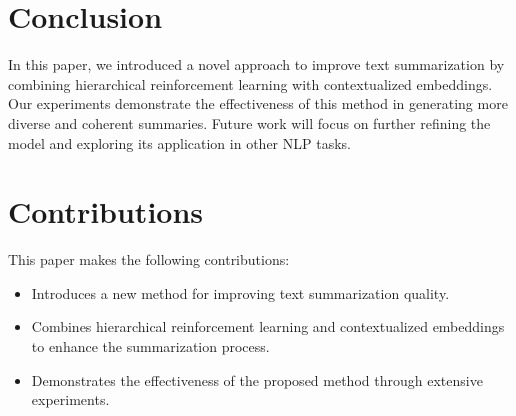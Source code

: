 \documentclass{article}
\begin{document}
\section{Conclusion}
In this paper, we introduced a novel approach to improve text summarization by combining hierarchical reinforcement learning with contextualized embeddings. Our experiments demonstrate the effectiveness of this method in generating more diverse and coherent summaries. Future work will focus on further refining the model and exploring its application in other NLP tasks.

\section{Contributions}
This paper makes the following contributions:
\begin{itemize}
    \item Introduces a new method for improving text summarization quality.
    \item Combines hierarchical reinforcement learning and contextualized embeddings to enhance the summarization process.
    \item Demonstrates the effectiveness of the proposed method through extensive experiments.
\end{itemize}



\end{document}
